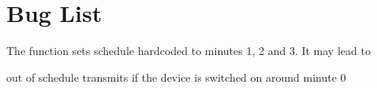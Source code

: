 \chapter{Bug List}
\hypertarget{bug}{}\label{bug}

\begin{DoxyRefList}
\item[Global \doxylink{_w_s_p_rbeacon_8h_af02dc9e0f37c96a17d2a35ed4b5b88e4}{WSPRbeacon\+Init} (const char \texorpdfstring{$\ast$}{*}pcallsign, const char \texorpdfstring{$\ast$}{*}pgridsquare, int txpow\+\_\+dbm, \doxylink{struct_pio_dco}{Pio\+Dco} \texorpdfstring{$\ast$}{*}pdco, uint32\+\_\+t dial\+\_\+freq\+\_\+hz, uint32\+\_\+t shift\+\_\+freq\+\_\+hz, int gpio, uint8\+\_\+t start\+\_\+minute, uint8\+\_\+t id13, uint8\+\_\+t suffix)]\label{bug__bug000001}%
%
The function sets schedule hardcoded to minutes 1, 2 and 3. It may lead to 



out of schedule transmits if the device is switched on around minute 0 ~\newline
 
\end{DoxyRefList}